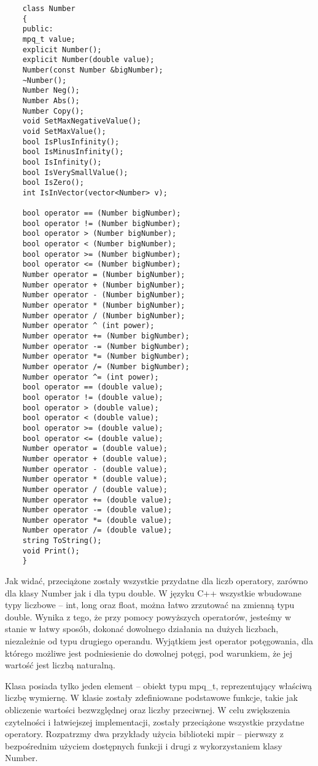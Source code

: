 \documentclass[oneside,a4paper]{book}
\begin{document}
	\begin{lstlisting}
	class Number
	{
	public:
	mpq_t value;
	explicit Number();
	explicit Number(double value);
	Number(const Number &bigNumber);
	~Number();
	Number Neg();
	Number Abs();
	Number Copy();
	void SetMaxNegativeValue();
	void SetMaxValue();
	bool IsPlusInfinity();
	bool IsMinusInfinity();
	bool IsInfinity();
	bool IsVerySmallValue();
	bool IsZero();
	int IsInVector(vector<Number> v);
	
	bool operator == (Number bigNumber);
	bool operator != (Number bigNumber);
	bool operator > (Number bigNumber);
	bool operator < (Number bigNumber);
	bool operator >= (Number bigNumber);
	bool operator <= (Number bigNumber);
	Number operator = (Number bigNumber);
	Number operator + (Number bigNumber);
	Number operator - (Number bigNumber);
	Number operator * (Number bigNumber);
	Number operator / (Number bigNumber);
	Number operator ^ (int power);
	Number operator += (Number bigNumber);
	Number operator -= (Number bigNumber);
	Number operator *= (Number bigNumber);
	Number operator /= (Number bigNumber);
	Number operator ^= (int power);
	bool operator == (double value);
	bool operator != (double value);
	bool operator > (double value);
	bool operator < (double value);
	bool operator >= (double value);
	bool operator <= (double value);
	Number operator = (double value);
	Number operator + (double value);
	Number operator - (double value);
	Number operator * (double value);
	Number operator / (double value);
	Number operator += (double value);
	Number operator -= (double value);
	Number operator *= (double value);
	Number operator /= (double value);
	string ToString();
	void Print();
	}
	\end{lstlisting}
	
	Jak widać, przeciążone zostały wszystkie przydatne dla liczb operatory, zarówno dla klasy Number jak i dla typu double. W języku C++ wszystkie wbudowane typy liczbowe -- int, long oraz float, można łatwo zrzutować na zmienną typu double. Wynika z tego, że przy pomocy powyższych operatorów, jesteśmy w stanie w łatwy sposób, dokonać dowolnego działania na dużych liczbach, niezależnie od typu drugiego operandu. Wyjątkiem jest operator potęgowania, dla którego możliwe jest podniesienie do dowolnej potęgi, pod warunkiem, że jej wartość jest liczbą naturalną.
	
	Klasa posiada tylko jeden element – obiekt typu mpq\_t, reprezentujący właściwą liczbę wymiernę. W klasie zostały zdefiniowane podstawowe funkcje, takie jak obliczenie wartości bezwzględnej oraz liczby przeciwnej. W celu zwiększenia czytelności i łatwiejszej implementacji, zostały przeciążone wszystkie przydatne operatory. Rozpatrzmy dwa przykłady użycia biblioteki mpir – pierwszy z bezpośrednim użyciem dostępnych funkcji i drugi z wykorzystaniem klasy Number.
	
\end{document}
